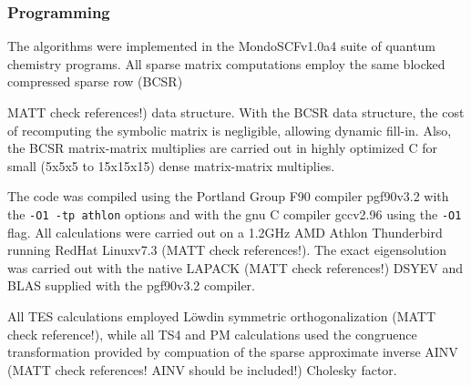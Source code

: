 \commentoutA{\documentclass[prb,aps,twocolumn,twocolumngrid,secnumarabic,superbib,hyperref]{revtex4}}
\begin{document}
\subsubsection{Programming}
The algorithms were implemented in the {\sc MondoSCF}v1.0a4 suite of 
quantum chemistry programs\cite{MondoSCF}.  
All sparse matrix computations employ the same blocked compressed sparse row 
(BCSR)\cite{Challacombe99,MChallacombe00} {MATT check references!) 
data structure.  With the BCSR data structure, the cost of recomputing the symbolic 
matrix is negligible, allowing dynamic fill-in.  Also, the BCSR matrix-matrix multiplies 
are carried out in highly optimized C for small 
(5x5x5 to 15x15x15) dense matrix-matrix multiplies. 

The code was compiled using the 
Portland Group F90 compiler {\sc pgf90}v3.2 \cite{pgf90} with the {\tt -O1 -tp athlon} 
options  and with the gnu C compiler {\sc gcc}v2.96 using the {\tt -O1} flag.  All 
calculations were carried out on a 1.2GHz AMD Athlon Thunderbird running RedHat 
{\sc Linux}v7.3\cite{RedHat73} (MATT check references!).  The exact eigensolution was carried out with the native
{\sc LAPACK} \cite{LAPACK}  (MATT check references!) {\sc DSYEV} and {\sc BLAS} supplied with the {\sc pgf90}v3.2 compiler.

All TES calculations employed L{\"o}wdin symmetric orthogonalization \cite{PLowdin50} (MATT check reference!), 
while all TS4 and PM calculations used the congruence transformation provided by
compuation of the sparse approximate inverse AINV \cite{AINV,MChallacombe02c} 
(MATT check references! AINV should be included!)
Cholesky factor.

}
\end{document}
